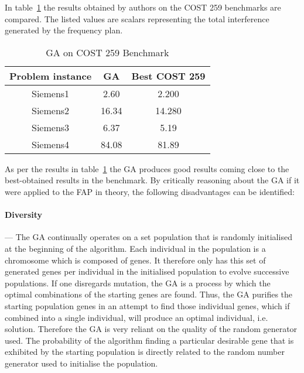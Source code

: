 In table~\ref{tab:GA} the results obtained by authors on the \gls{COST} 259 benchmarks are compared. The listed values are scalars representing the total interference generated by the frequency plan.
\begin{table}[H]
\centering
	\begin{tabular}{| c | c | c |}
	\hline
	Problem instance & \gls{GA} & Best \gls{COST} 259 \\ \hline
	Siemens1 & 2.60 & 2.200 \\ \hline
	Siemens2 & 16.34 & 14.280 \\ \hline
	Siemens3 & 6.37 & 5.19 \\ \hline
	Siemens4 & 84.08 & 81.89 \\ \hline
	\end{tabular}
\caption{GA on \gls{COST} 259 Benchmark}
\label{tab:GA}
\end{table}

As per the results in table~\ref{tab:GA} the \gls{GA} produces good results coming close to the best-obtained results in the benchmark. By critically reasoning about the \gls{GA} if it were applied to the \gls{FAP} in theory, the following disadvantages can be identified:

\paragraph{Diversity}
--- The \gls{GA} continually operates on a set population that is randomly initialised at the beginning of the algorithm. Each individual in the population is a chromosome which is composed of genes. It therefore only has this set of generated genes per individual in the initialised population to evolve successive populations.
If one disregards mutation, the \gls{GA} is a process by which the optimal combinations of the starting genes are found. Thus, the \gls{GA} purifies the starting population genes in an attempt to find those individual genes, which if combined into a single individual, will produce an optimal individual, i.e. solution. Therefore the \gls{GA} is very reliant on the quality of the random generator used. The probability of the algorithm finding a particular desirable gene that is exhibited by the starting population is directly related to the random number generator used to initialise the population. 
